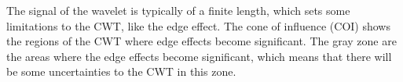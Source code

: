 The signal of the wavelet is typically of a finite length, which sets some limitations to the CWT, like the edge effect. The cone of influence (COI) shows the regions of the CWT where edge effects become significant. The gray zone are the areas where the edge effects become significant, which means that there will be some uncertainties to the CWT in this zone. \cite{math}


